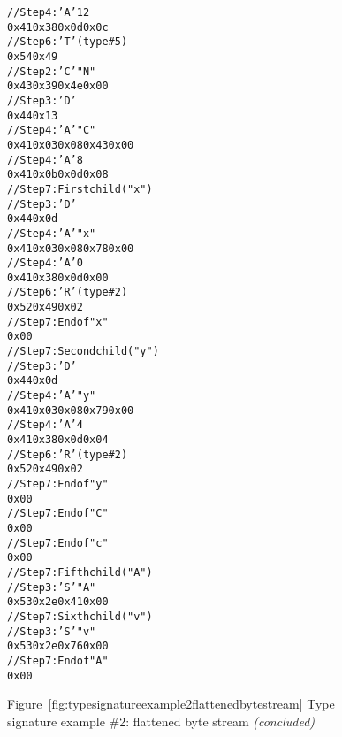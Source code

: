 \begin{figure}
\begin{dwflisting}
\begin{alltt}
    // Step 4: 'A'   12
    0x41 0x38 0x0d 0x0c
    // Step 6: 'T'  (type \#5)
    0x54 0x49
        // Step 2: 'C'  "N"
        0x43 0x39 0x4e 0x00
        // Step 3: 'D' 
        0x44 0x13
        // Step 4: 'A'   "C"
        0x41 0x03 0x08 0x43 0x00
        // Step 4: 'A'   8
        0x41 0x0b 0x0d 0x08
        // Step 7: First child ("x")
            // Step 3: 'D' 
            0x44 0x0d
            // Step 4: 'A'   "x"
            0x41 0x03 0x08 0x78 0x00
            // Step 4: 'A'   0
            0x41 0x38 0x0d 0x00
            // Step 6: 'R'  (type \#2)
            0x52 0x49 0x02
            // Step 7: End of  "x"
            0x00
        // Step 7: Second child ("y")
            // Step 3: 'D' 
            0x44 0x0d
            // Step 4: 'A'   "y"
            0x41 0x03 0x08 0x79 0x00
            // Step 4: 'A'   4
            0x41 0x38 0x0d 0x04
            // Step 6: 'R'  (type \#2)
            0x52 0x49 0x02
            // Step 7: End of  "y"
            0x00
        // Step 7: End of  "C"
        0x00
    // Step 7: End of  "c"
    0x00
// Step 7: Fifth child ("A")
    // Step 3: 'S'  "A"
    0x53 0x2e 0x41 0x00
// Step 7: Sixth child ("v")
    // Step 3: 'S'  "v"
    0x53 0x2e 0x76 0x00
// Step 7: End of  "A"
0x00
\end{alltt}
\end{dwflisting}
\begin{center}
Figure~\ref{fig:typesignatureexample2flattenedbytestream} Type signature example \#2: flattened byte stream \textit{(concluded)}
\end{center}
\end{figure}

